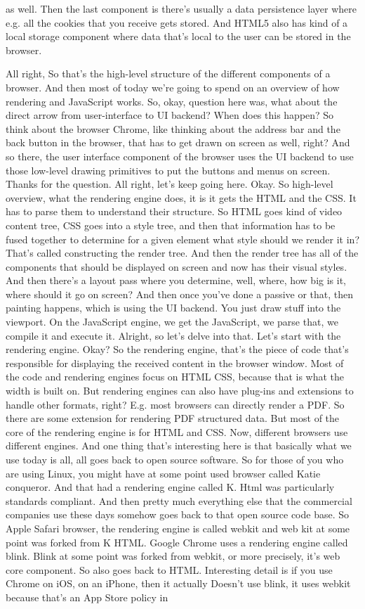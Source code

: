 as well. Then the last component is there's usually a data persistence layer where e.g. all the cookies that you receive gets stored. And HTML5 also has kind of a local storage component where data that's local to the user can be stored in the browser. 

All right, So that's the high-level structure of the different components of a browser. And then most of today we're going to spend on an overview of how rendering and JavaScript works. So, okay, question here was, what about the direct arrow from user-interface to UI backend? When does this happen? So think about the browser Chrome, like thinking about the address bar and the back button in the browser, that has to get drawn on screen as well, right? And so there, the user interface component of the browser uses the UI backend to use those low-level drawing primitives to put the buttons and menus on screen. Thanks for the question. All right, let's keep going here. Okay. So high-level overview, what the rendering engine does, it is it gets the HTML and the CSS. It has to parse them to understand their structure. So HTML goes kind of video content tree, CSS goes into a style tree, and then that information has to be fused together to determine for a given element what style should we render it in? That's called constructing the render tree. And then the render tree has all of the components that should be displayed on screen and now has their visual styles. And then there's a layout pass where you determine, well, where, how big is it, where should it go on screen? And then once you've done a passive or that, then painting happens, which is using the UI backend. You just draw stuff into the viewport. On the JavaScript engine, we get the JavaScript, we parse that, we compile it and execute it. Alright, so let's delve into that. Let's start with the rendering engine. Okay? So the rendering engine, that's the piece of code that's responsible for displaying the received content in the browser window. Most of the code and rendering engines focus on HTML CSS, because that is what the width is built on. But rendering engines can also have plug-ins and extensions to handle other formats, right? E.g. most browsers can directly render a PDF. So there are some extension for rendering PDF structured data. But most of the core of the rendering engine is for HTML and CSS. Now, different browsers use different engines. And one thing that's interesting here is that basically what we use today is all, all goes back to open source software. So for those of you who are using Linux, you might have at some point used browser called Katie conqueror. And that had a rendering engine called K. Html was particularly standards compliant. And then pretty much everything else that the commercial companies use these days somehow goes back to that open source code base. So Apple Safari browser, the rendering engine is called webkit and web kit at some point was forked from K HTML. Google Chrome uses a rendering engine called blink. Blink at some point was forked from webkit, or more precisely, it's web core component. So also goes back to HTML. Interesting detail is if you use Chrome on iOS, on an iPhone, then it actually Doesn't use blink, it uses webkit because that's an App Store policy in 